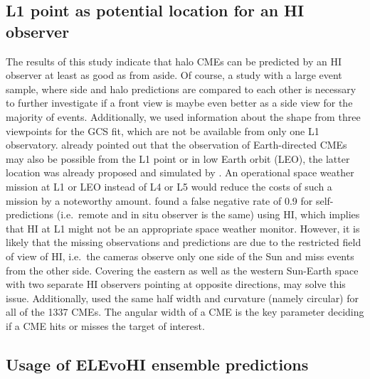 \documentclass[draft]{agujournal}
\begin{document}
\subsection{L1 point as potential location for an HI observer}

The results of this study indicate that halo CMEs can be predicted by an HI observer at least as good as from aside. Of course, a study with a large event sample, where side and halo predictions are compared to each other is necessary to further investigate if a front view is maybe even better as a side view for the majority of events. Additionally, we used information about the shape from three viewpoints for the GCS fit, which are not be available from only one L1 observatory.
\citet{def16} already pointed out that the observation of Earth-directed CMEs may also be possible from the L1 point or in low Earth orbit (LEO), the latter location was already proposed and simulated by \citet{defhow15}. An operational space weather mission at L1 or LEO instead of L4 or L5 would reduce the costs of such a mission by a noteworthy amount.
\citet{moe17} found a false negative rate of 0.9 for self-predictions (i.e.\ remote and in situ observer is the same) using HI, which implies that HI at L1 might not be an appropriate space weather monitor. However, it is likely that the missing observations and predictions are due to the restricted field of view of HI, i.e.\ the cameras observe only one side of the Sun and miss events from the other side. Covering the eastern as well as the western Sun-Earth space with two separate HI observers pointing at opposite directions, may solve this issue. Additionally, \citet{moe17} used the same half width and curvature (namely circular) for all of the 1337 CMEs. The angular width of a CME is the key parameter deciding if a CME hits or misses the target of interest.

\subsection{Usage of ELEvoHI ensemble predictions}
\end{document}
